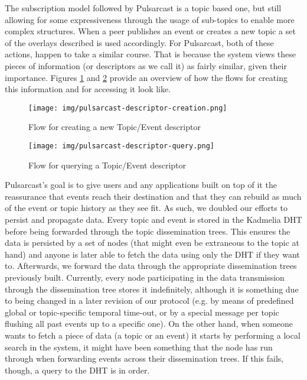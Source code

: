 The subscription model followed by Pulsarcast is a topic based one, but still
allowing for some expressiveness through the usage of sub-topics to enable more
complex structures. When a peer publishes an event or creates a new topic a set
of the overlays described is used accordingly. For Pulsarcast, both of these
actions, happen to take a similar course. That is because the system views
these pieces of information (or descriptors as we call it) as fairly similar,
given their importance. Figures \ref{fig:pulsarcast-descriptor-creation} and
\ref{fig:pulsarcast-descriptor-query} provide an overview of how the flows for
creating this information and for accessing it look like.

\begin{figure}[hb!]
  \centering
  \texttt{[image: img/pulsarcast-descriptor-creation.png]}
  \caption{Flow for creating a new Topic/Event descriptor}
  \label{fig:pulsarcast-descriptor-creation}
\end{figure}

\begin{figure}[tb!]
  \centering
  \texttt{[image: img/pulsarcast-descriptor-query.png]}
  \caption{Flow for querying a Topic/Event descriptor}
  \label{fig:pulsarcast-descriptor-query}
\end{figure}

Pulsarcast's goal is to give users and any applications built on top of it the
reassurance that events reach their destination and that they can rebuild as
much of the event or topic history as they see fit. As such, we doubled our
efforts to persist and propagate data. Every topic and event is stored in the
Kadmelia DHT before being forwarded through the topic dissemination
trees.  This ensures the data is persisted by a set of nodes (that might even
be extraneous to the topic at hand) and anyone is later able to fetch the data
using only the DHT if they want to. Afterwards, we forward the data
through the appropriate dissemination trees previously built.
Currently, every node participating in the data transmission through the
dissemination tree stores it indefinitely, although it is something due to
being changed in a later revision of our protocol (e.g. by means of predefined
global or topic-specific temporal time-out, or by a special message per topic
flushing all past events up to a specific one). On the other hand, when someone
wants to fetch a piece of data (a topic or an event) it starts by performing a
local search in the system, it might have been something that the node has run
through when forwarding events across their dissemination trees. If this fails,
though, a query to the DHT is in order.

